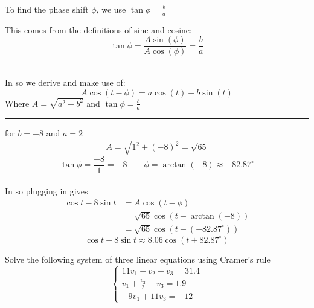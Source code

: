 \documentclass[a4paper, 12pt]{report}
\begin{document}
    \vspace{1em}
    To find the phase shift \(\phi\), we use $\tan \phi = \frac{b}{a}$\\[1em]
    \begin{minipage}{0.45\textwidth}\centering
        This comes from the definitions of sine and cosine:
        \[\tan \phi = \frac{A \sin(\phi)}{A \cos(\phi)} = \frac{b}{a}\]
    \end{minipage}\\
    \vspace{1em}
    In so we derive and make use of:
    \[A \cos(t - \phi) = a \cos(t) + b \sin(t)\]
    Where $A = \sqrt{a^2 + b^2}$ and $\tan \phi = \frac{b}{a}$\\
    \vspace{0.5em}\hrule\vspace{0.5em}
    for $b=-8$ and $a=2$
    \[A = \sqrt{1^2 + (-8)^2} = \sqrt{65}\]
    \[\tan \phi = \frac{-8}{1}=-8 \qquad \phi = \arctan(-8) \approx -82.87^\circ\]\\[6pt]
    In so plugging in gives
    \begin{align*}
    \cos t-8 \sin t &= A \cos(t - \phi)\\
    &= \sqrt{65} \cos(t - \arctan(-8))\\
    &= \sqrt{65} \cos(t - (-82.87^\circ))   
    \end{align*}
    \[\boxed{\cos t-8 \sin t \approx  8.06 \cos(t + 82.87^\circ)}\]
    
    \newpage
    \begin{tcolorbox}[title=\color{black}{\section{Q5}}, colback=white, colframe=black!30!white, boxrule=0.4mm, width=1\textwidth]
        Solve the following system of three linear equations using Cramer's rule
        \[
        \left\{\begin{array}{c}
            11 v_{1}-v_{2}+v_{3}=31.4 \\
            v_{1}+\frac{v_{2}}{2}-v_{3}=1.9 \\
            -9 v_{1}+11 v_{3}=-12
        \end{array}\right.
        \]
    \end{tcolorbox}
    
\end{document}
